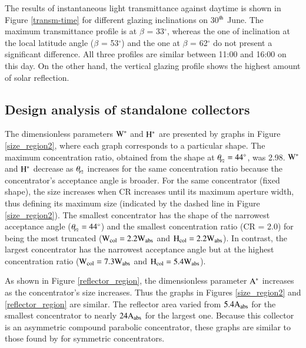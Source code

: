 
The results of instantaneous light transmittance against daytime is shown in Figure \ref{transm-time} for different glazing inclinations on 30$^{\rm th}$ June. The maximum transmittance profile is at $\beta$ = 33$^{\circ}$, whereas the one of inclination at the local latitude angle ($\beta$ = 53$^{\circ}$) and the one at $\beta$ = 62$^{\circ}$ do not present a significant difference. All three profiles are similar between 11:00 and 16:00 on this day. On the other hand, the vertical glazing profile shows the highest amount of solar reflection.


\subsection{Design analysis of standalone collectors}

The dimensionless parameters $\rm{W^{*}}$ and $\rm{H^{*}}$ are presented by graphs in Figure \ref{size_region2}, where each graph corresponds to a particular shape. The maximum concentration ratio, obtained from the shape at $\theta_{\!_{\rm{P2}}} = 44^{\circ}$, was 2.98. $\rm{W^{*}}$ and $\rm{H^{*}}$ decrease as $\theta_{\!_{\rm{P2}}}$ increases for the same concentration ratio because the concentrator's acceptance angle is broader. For the same concentrator (fixed shape), the size increases when CR increases until its maximum aperture width, thus defining its maximum size (indicated by the dashed line in Figure \ref{size_region2}). The smallest concentrator has the shape of the narrowest acceptance angle ($\theta_{\!_{\rm{P2}}} = 44^{\circ}$) and the smallest concentration ratio (CR = 2.0) for being the most truncated ($\rm{W_{col} = 2.2W_{abs}}$ and $\rm{H_{col} = 2.2W_{abs}}$). In contrast, the largest concentrator has the narrowest acceptance angle but at the highest concentration ratio ($\rm{W_{col} = 7.3W_{abs}}$ and $\rm{H_{col} = 5.4W_{abs}}$). 


As shown in Figure \ref{reflector_region}, the dimensionless parameter $\rm{A^{*}}$ increases as the concentrator's size increases. Thus the graphs in Figures \ref{size_region2} and \ref{reflector_region} are similar. The reflector area varied from $\rm{5.4A_{abs}}$ for the smallest concentrator to nearly $\rm{24A_{abs}}$ for the largest one. Because this collector is an asymmetric compound parabolic concentrator, these graphs are similar to those found by \citet{Rabl1976} for symmetric concentrators.

